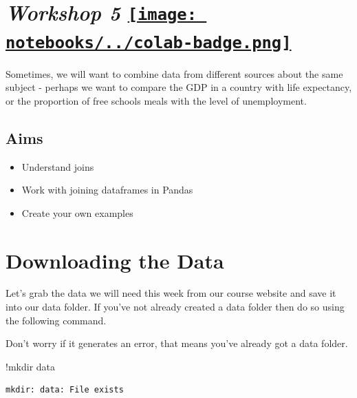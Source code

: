 \documentclass[
  letterpaper,
  DIV=11,
  numbers=noendperiod]{scrreprt}
\newenvironment{Shaded}{\begin{snugshade}}{\end{snugshade}}
\newcommand{\NormalTok}[1]{\textcolor[rgb]{0.00,0.23,0.31}{#1}}
\newcommand{\OperatorTok}[1]{\textcolor[rgb]{0.37,0.37,0.37}{#1}}
\providecommand{\tightlist}{%
  \setlength{\itemsep}{0pt}\setlength{\parskip}{0pt}}\usepackage{longtable,booktabs,array}
\begin{document}
\hypertarget{workshop-5-open-in-colab}{%
\section[\emph{Workshop 5} ]{\texorpdfstring{\emph{Workshop 5}
\href{https://colab.research.google.com/github/oballinger/QM2/blob/main/notebooks/W05.\%20Merging\%20and\%20Joining.ipynb}{\protect\texttt{[image: notebooks/../colab-badge.png]}}}{Workshop 5 Open In Colab}}\label{workshop-5-open-in-colab}}

Sometimes, we will want to combine data from different sources about the
same subject - perhaps we want to compare the GDP in a country with life
expectancy, or the proportion of free schools meals with the level of
unemployment.

\hypertarget{aims-2}{%
\subsection{Aims}\label{aims-2}}

\begin{itemize}
\tightlist
\item
  Understand joins
\item
  Work with joining dataframes in Pandas
\item
  Create your own examples
\end{itemize}

\hypertarget{downloading-the-data-3}{%
\section{Downloading the Data}\label{downloading-the-data-3}}

Let's grab the data we will need this week from our course website and
save it into our data folder. If you've not already created a data
folder then do so using the following command.

Don't worry if it generates an error, that means you've already got a
data folder.

\begin{Shaded}
\begin{Highlighting}[]
\OperatorTok{!}\NormalTok{mkdir data}
\end{Highlighting}
\end{Shaded}

\begin{verbatim}
mkdir: data: File exists
\end{verbatim}
\end{document}
